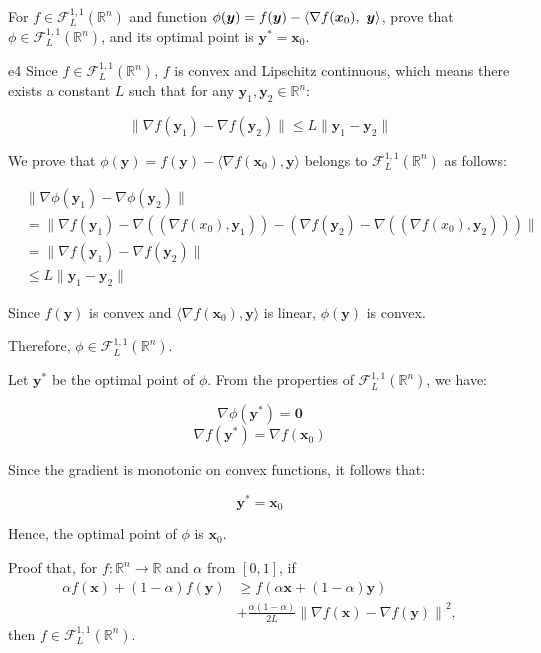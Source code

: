 \documentclass{article}
\newcommand{\xB}{\bm{x}}
\newcommand{\yB}{\bm{y}}
\newcommand{\RBB}{\mathbb{R}}
\newcommand{\FM}{\mathcal{F}}
\newcommand{\functiontype}[3]{\FM_{#1}^{#2,#3}(\RBB^n)}
\newcommand{\normgen}[1]{\left\| #1 \right\|}
\begin{document}
\newpage
\begin{excercise}\label{e4}
For $f \in \functiontype{L}{1}{1}$ and function $\phi(\yB) = f(\yB) - \innerproduct{\nabla f(\xB_0)}{\yB}$, prove that $\phi \in \functiontype{L}{1}{1}$, and its optimal point is $\yB^* = \xB_0$.
\end{excercise}
\begin{PROOF}{e4}
	Since $f \in \mathcal{F}_{L}^{1,1}(\mathbb{R}^{n})$, $f$ is convex and Lipschitz continuous, which means there exists a constant $L$ such that for any $\bm{y}_{1}, \bm{y}_{2} \in \mathbb{R}^{n}$:

    \[
    \|\nabla f(\bm{y}_{1}) - \nabla f(\bm{y}_{2})\| \leq L \|\bm{y}_{1} - \bm{y}_{2}\|
    \]

    We prove that $\phi(\bm{y}) = f(\bm{y}) - \langle \nabla f(\bm{x}_{0}), \bm{y} \rangle$ belongs to $\mathcal{F}_{L}^{1,1}(\mathbb{R}^{n})$ as follows:

    \begin{align*}
    &\|\nabla \phi(\bm{y}_{1}) - \nabla \phi(\bm{y}_{2})\|\\ 
	&= \|\nabla f(\bm{y}_{1}) - \nabla ((\nabla f(x_{0}), \bm{y}_{1})) - (\nabla f(\bm{y}_{2}) - \nabla ((\nabla f(x_{0}), \bm{y}_{2})))\| \\
	&= \|\nabla f(\bm{y}_{1}) - \nabla f(\bm{y}_{2})\| \\
	&\leq L \|\bm{y}_{1} - \bm{y}_{2}\|
    \end{align*}

    Since $f(\bm{y})$ is convex and $\langle \nabla f(\bm{x}_{0}), \bm{y} \rangle$ is linear, $\phi(\bm{y})$ is convex.

    Therefore, $\phi \in \mathcal{F}_{L}^{1,1}(\mathbb{R}^{n})$.

    Let $\bm{y}^{*}$ be the optimal point of $\phi$. From the properties of $\mathcal{F}_{L}^{1,1}(\mathbb{R}^{n})$, we have:

    \[
    \nabla \phi(\bm{y}^{*}) = \bm{0}
    \]
    \[
    \nabla f(\bm{y}^{*}) = \nabla f(\bm{x}_{0})
    \]

    Since the gradient is monotonic on convex functions, it follows that:

    \[
    \bm{y}^{*} = \bm{x}_{0}
    \]

    Hence, the optimal point of $\phi$ is $\bm{x}_{0}$.
\end{PROOF}
\newpage
\begin{excercise}\label{e5}
Proof that, for $f: \RBB^n \rightarrow \RBB$ and $\alpha$ from $[0,1]$,  if
\begin{align*} 
	\alpha f(\xB) + (1-\alpha) f(\yB) &\geq f( \alpha \xB + (1-\alpha) \yB) \nonumber \\
	&+ \frac{\alpha(1-\alpha)}{2L} \normgen{\nabla f(\xB) - \nabla f(\yB)}^2, 
\end{align*}
then $f \in \functiontype{L}{1}{1}$.
\end{excercise}
\end{document}
